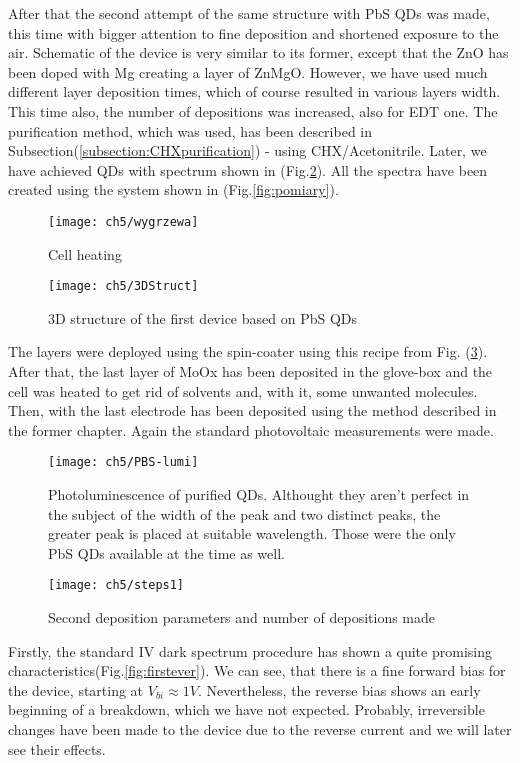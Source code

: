 After that the second attempt of the same structure with PbS QDs was made, this time with bigger attention to fine deposition and shortened exposure to the air. Schematic of the device is very similar to its former, except that the ZnO has been doped with Mg creating a layer of ZnMgO. However, we have used much different layer deposition times, which of course resulted in various layers width. This time also, the number of depositions was increased, also for EDT one. The purification method, which was used, has been described in Subsection(\ref{subsection:CHXpurification}) - using CHX/Acetonitrile. Later, we have achieved QDs with spectrum shown in (Fig.\ref{fig:PBS}). All the spectra have been created using the system shown in (Fig.\ref{fig:pomiary}).

\begin{figure}[H]
\centering
\texttt{[image: ch5/wygrzewa]}
\caption{Cell heating}
\end{figure}

\begin{figure}
\center
\texttt{[image: ch5/3DStruct]}
\caption{3D structure of the first device based on PbS QDs}
\label{fig:1stStructure}
\end{figure}
The layers were deployed using the spin-coater using this recipe from Fig. (\ref{fig:steps1}). After that, the last layer of MoOx has been deposited in the glove-box and the cell was heated to get rid of solvents and, with it, some unwanted molecules. Then, with the last electrode has been deposited using the method described in the former chapter. Again the standard photovoltaic measurements were made.

\begin{figure}
\centering
\texttt{[image: ch5/PBS-lumi]}
\caption{Photoluminescence of purified QDs. Althought they aren't perfect in the subject of the width of the peak and two distinct peaks, the greater peak is placed at suitable wavelength. Those were the only PbS QDs available at the time as well. }
\label{fig:PBS}
\end{figure}


\begin{figure}[H]
\centering
\texttt{[image: ch5/steps1]}
\caption{Second deposition parameters and number of depositions made}
\label{fig:steps1}
\end{figure}

Firstly, the standard IV dark spectrum procedure has shown a quite promising characteristics(Fig.\ref{fig:firstever}). We can see, that there is a fine forward bias for the device, starting at $V_{bi} \approx 1V$. Nevertheless, the reverse bias shows an early beginning of a breakdown, which we have not expected. Probably, irreversible changes have been made to the device due to the reverse current and we will later see their effects.  

